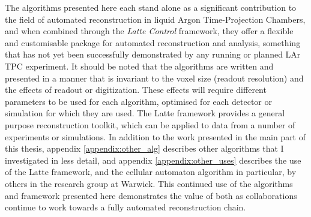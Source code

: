 The algorithms presented here each stand alone as a significant contribution to the field of automated reconstruction in liquid Argon Time-Projection Chambers, and when combined through the \emph{Latte Control} framework, they offer a flexible and customisable package for automated reconstruction and analysis, something that has not yet been successfully demonstrated by any running or planned \ac{LAr TPC} experiment. It should be noted that the algorithms are written and presented in a manner that is invariant to the voxel size (readout resolution) and the effects of readout or digitization. These effects will require different parameters to be used for each algorithm, optimised for each detector or simulation for which they are used. The Latte framework provides a general purpose reconstruction toolkit, which can be applied to data from a number of experiments or simulations. In addition to the work presented in the main part of this thesis, appendix \ref{appendix:other_alg} describes other algorithms that I investigated in less detail, and appendix \ref{appendix:other_uses} describes the use of the Latte framework, and the cellular automaton algorithm in particular, by others in the research group at Warwick. This continued use of the algorithms and framework presented here demonstrates the value of both as collaborations continue to work towards a fully automated reconstruction chain.
